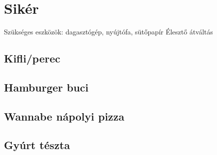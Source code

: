 \chapter*{Sikér}

\lipsum[1]

Szükséges eszközök: dagasztógép, nyújtófa, sütőpapír
Élesztő átváltás



\section*{Kifli/perec}
\lipsum[1-4]

\section*{Hamburger buci}
\section*{Wannabe nápolyi pizza}
\section*{Gyúrt tészta}
